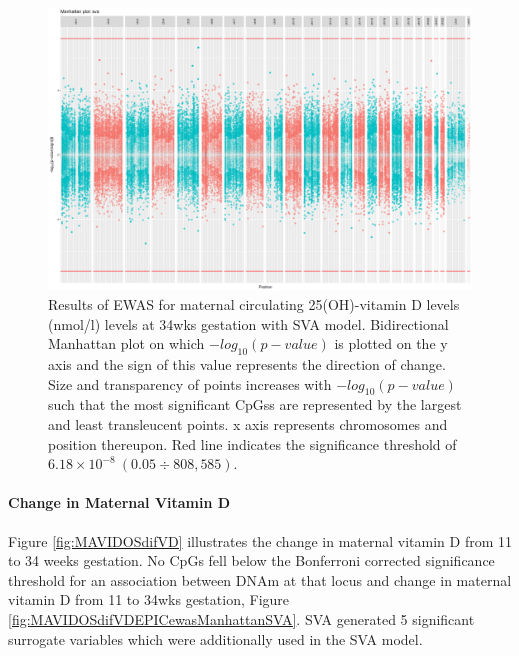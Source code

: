 \documentclass[
]{book}
\begin{document}
\begin{figure}

{\centering \includegraphics[width=0.8\linewidth]{figs/MAVIDOSmVitD34EPICewasManhattanSVA} 

}

\caption{Results of EWAS for maternal circulating 25(OH)-vitamin D levels (nmol/l) levels at 34wks gestation with SVA model. Bidirectional Manhattan plot on which \(-log_{10}(p-value)\) is plotted on the y axis and the sign of this value represents the direction of change. Size and transparency of points increases with \(-log_{10}(p-value)\) such that the most significant CpGss are represented by the largest and least transleucent points. x axis represents chromosomes and position thereupon. Red line indicates the significance threshold of \(6.18\times10^{-8}~(0.05\div808,585)\).}\label{fig:MAVIDOSmVitD34EPICewasManhattanSVA}
\end{figure}



\hypertarget{change-in-maternal-vitamin-d}{%
\paragraph{Change in Maternal Vitamin D}\label{change-in-maternal-vitamin-d}}

Figure \ref{fig:MAVIDOSdifVD} illustrates the change in maternal vitamin D from 11 to 34 weeks gestation.
No CpGs fell below the Bonferroni corrected significance threshold for an association between DNAm at that locus and change in maternal vitamin D from 11 to 34wks gestation, Figure \ref{fig:MAVIDOSdifVDEPICewasManhattanSVA}.
SVA generated 5 significant surrogate variables which were additionally used in the SVA model.
\end{document}

